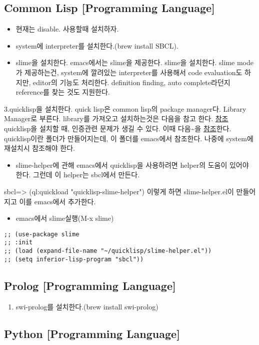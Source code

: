 \documentclass[11pt]{article}
\begin{document}
\subsection*{Common Lisp [Programming Language]}
\label{sec:org57c49dc}
\begin{itemize}
\item 현재는 disable.  사용할때 설치하자.
\item system에 interpreter를 설치한다.(brew install SBCL).
\item slime을 설치한다. emacs에서는 slime을 제공한다. slime을 설치한다. slime mode가 제공하는건, system에 깔려있는 interpreter를 사용해서 code evaluation도 하지만, editor의 기능도 처리한다. definition finding, auto complete라던지 reference를 찾는 것도 지원한다.
\end{itemize}
3.quicklisp을 설치한다. quick lisp은 common lisp의 package manager다. Library Manager로 부른다.
library를 가져오고 설치하는것은 다음을 참고 한다.
\href{https://www.quicklisp.org/beta/\#installation}{참조}
quicklisp을 설치할 때, 인증관련 문제가 생길 수 있다. 이때 다음\textasciitilde{}을 \href{https://www.cs.dartmouth.edu/\~sergey/cs59/lisp/sbcl-quicklisp-install-log.txt}{참조}한다.
quicklisp이란 폴더가 만들어지는데, 이 폴더를 emacs에서 참조한다. 나중에 system에 재설치시 참조해야 한다.
\begin{itemize}
\item slime-helper에 관해
emacs에서 quicklisp을 사용하려면 helper의 도움이 있어야 한다. 그런데 이 helper는 sbcl에서 만든다.
\end{itemize}
sbcl=> (ql:quickload "quicklisp-slime-helper") 이렇게 하면
slime-helper.el이 만들어지고 이를 emacs에서 추가한다.
\begin{itemize}
\item emacs에서 slime실행(M-x slime)
\end{itemize}
\begin{verbatim}
;; (use-package slime
;; :init
;; (load (expand-file-name "~/quicklisp/slime-helper.el"))
;; (setq inferior-lisp-program "sbcl"))
\end{verbatim}
\subsection*{Prolog [Programming Language]}
\label{sec:orgb436928}
\begin{enumerate}
\item swi-prolog를 설치한다.(brew install swi-prolog)
\end{enumerate}
\subsection*{Python [Programming Language]}
\label{sec:orgca05607}
\end{document}
